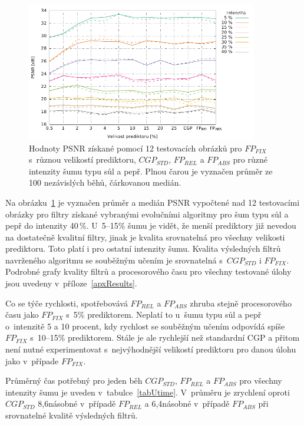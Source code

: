 \begin{figure}[hbt]
    \centering
    \includegraphics[width=0.9\textwidth]{fig/plot/compare/lineplot-psnr-sp-40.pdf}
    \caption{Hodnoty PSNR získané pomocí 12 testovacích obrázků pro $\mathit{FP_{FIX}}$ s~různou velikostí prediktoru, $\mathit{CGP_{STD}}$, $\mathit{FP_{REL}}$ a $\mathit{FP_{ABS}}$ pro různé intenzity šumu typu sůl a pepř. Plnou čarou je vyznačen průměr ze 100 nezávislých běhů, čárkovanou medián.}
    \label{plotComparisonSP40}
\end{figure}

Na obrázku~\ref{plotComparisonSP40} je vyznačen průměr a medián PSNR vypočtené nad 12 testovacími obrázky pro filtry získané vybranými evolučními algoritmy pro šum typu sůl a pepř do intenzity 40\,\%. U~5--15\% šumu je vidět, že menší prediktory již nevedou na dostatečně kvalitní filtry, jinak je kvalita srovnatelná pro všechny velikosti prediktoru. Toto platí i pro ostatní intenzity šumu. Kvalita výsledných filtrů navrženého algoritmu se souběžným učením je srovnatelná s~$\mathit{CGP_{STD}}$ i $\mathit{FP_{FIX}}$. Podrobné grafy kvality filtrů a procesorového času pro všechny testované úlohy jsou uvedeny v~příloze~\ref{apxResults}.

Co se týče rychlosti, spotřebovává $\mathit{FP_{REL}}$ a $\mathit{FP_{ABS}}$ zhruba stejně procesorového času jako $\mathit{FP_{FIX}}$ s~5\% prediktorem. Neplatí to u~šumu typu sůl a pepř o~intenzitě 5 a 10 procent, kdy rychlost se souběžným učením odpovídá spíše $\mathit{FP_{FIX}}$ s~10--15\% prediktorem. Stále je ale rychlejší než standardní CGP a přitom není nutné experimentovat s~nejvýhodnější velikostí prediktoru pro danou úlohu jako v~případe $\mathit{FP_{FIX}}$.

Průměrný čas potřebný pro jeden běh $\mathit{CGP_{STD}}$, $\mathit{FP_{REL}}$ a $\mathit{FP_{ABS}}$ pro všechny intenzity šumu je uveden v~tabulce~\ref{tabUtime}. V~průměru je zrychlení oproti $\mathit{CGP_{STD}}$ 8,6násobné v~případě $\mathit{FP_{REL}}$ a 6,4násobné v~případě $\mathit{FP_{ABS}}$ při srovnatelné kvalitě výsledných filtrů.

